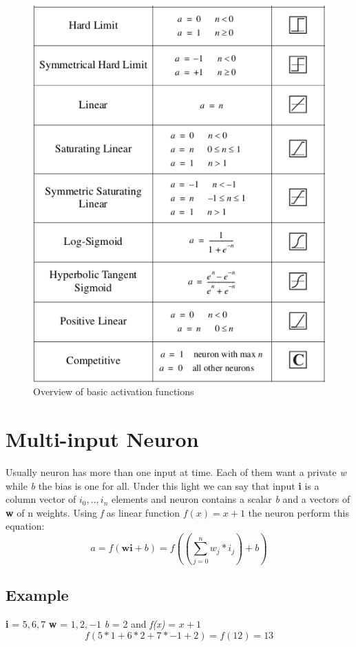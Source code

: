 \documentclass[12pt,a4paper,twoside,openright]{scrbook}
\begin{document}
\begin{figure}
    \centering
    \includegraphics[scale=0.65]{img/activation-functions-table.png}
    \caption{Overview of basic activation functions}
    \label{img:activation-functions-basic}
\end{figure}


\section{Multi-input Neuron}
Usually neuron has more than one input at time. Each of them want a private \textit{w} while \textit{b} the bias is one for all. Under this light we can say that input \textbf{i} is a column vector of $i_0,.., i_n$ elements and neuron contains a scalar \textit{b} and a vectors of \textbf{w} of n weights. Using \textit{f} as linear function $f(x) =x + 1$ the neuron perform this equation:
\begin{equation}
a = f(\textbf{wi} + b) = f((\sum_{j=0}^{n} w_j * i_j) + b)
\end{equation}

\subsection{Example}
\textbf{i} = $5,6,7$ \textbf{w} = $1,2,-1$ \textit{b} = 2 and \textit{f(x)} = $x + 1$  
\begin{equation}
f(5*1 + 6*2 + 7*-1 + 2) = f(12) = 13
\end{equation}
\end{document}
